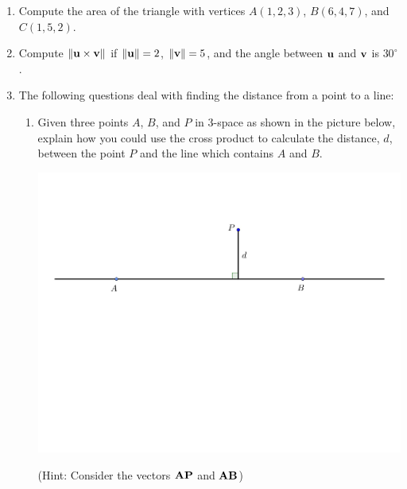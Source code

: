 \documentclass[12pt]{article}
\newif\ifans
\begin{document}
\begin{enumerate}
\item Compute the area of the triangle with vertices $A(1,2,3)$, $B(6,4,7)$, and $C(1,5,2)$.

\ifans{\fbox{$\frac{1}{2}\sqrt{446}$}} \fi

\item Compute $\|{\bf u} \times {\bf v}\|$ if $\|{\bf u}\|=2$, $\|{\bf v}\|=5$, and the angle between ${\bf u}$ and ${\bf v}$ is $30^{\circ}$.

\ifans{\fbox{5}} \fi

\item The following questions deal with finding the distance from a point to a line:

\begin{enumerate}

\item Given three points $A$, $B$, and $P$ in 3-space as shown in the picture below, explain how you could use the cross product to calculate the distance, $d$, between the point $P$ and the line which contains $A$ and $B$.  

\begin{center}
\includegraphics[scale=0.5]{length.pdf}
\end{center}

(Hint: Consider the vectors ${\bf AP}$ and ${\bf AB}$)

\ifans{\fbox{\parbox{1\linewidth}{Let $\theta$ be the angle between ${\bf AP}$ and ${\bf AB}$.  Then:
\begin{align*}
d&=\|{\bf AP}\|\sin{\theta}\\
&=\frac{\|{\bf AP}\|\|{\bf AB}\|\sin{\theta}}{\|{\bf AB}\|}\\
&=\frac{\|{\bf AP}\times{\bf AB}\|}{\|{\bf AB}\|}
\end{align*}
}}} \fi


\end{enumerate}
\end{enumerate}
\end{document}
